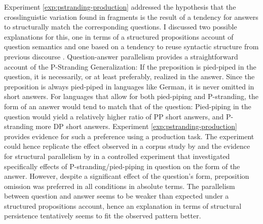 Experiment \ref{exp:pstranding-production} addressed the hypothesis that the crosslinguistic variation found in fragments is the result of a tendency for answers to structurally match the corresponding questions. I discussed two possible explanations for this, one in terms of a structured propositions account of question semantics \citep{reich2002, griffiths2019} and one based on a tendency to reuse syntactic structure from previous discourse \citep{levelt.kelter1982}. Question-answer parallelism provides a straightforward account of the P-Stranding Generalization: If the preposition is pied-piped in the question, it is necessarily, or at least preferably, realized in the answer. Since the preposition is always pied-piped in languages like German, it is never omitted in short answers. For languages that allow for both pied-piping and P-stranding, the form of an answer would tend to match that of the question: Pied-piping in the question would yield a relatively higher ratio of PP short answers, and P-stranding more DP short answers. Experiment \ref{exp:pstranding-production} provides evidence for such a preference using a production task. The experiment could hence replicate the effect observed in a corpus study by \citet{nykiel2017} and the evidence for structural parallelism by \citet{levelt.kelter1982} in a controlled experiment that investigated specifically effects of P-stranding/pied-piping in question on the form of the answer. However, despite a significant effect of the question's form, preposition omission was preferred in all conditions in absolute terms. The parallelism between question and answer seems to be weaker than expected under a structured propositions account, hence an explanation in terms of structural persistence tentatively seems to fit the observed pattern better.

